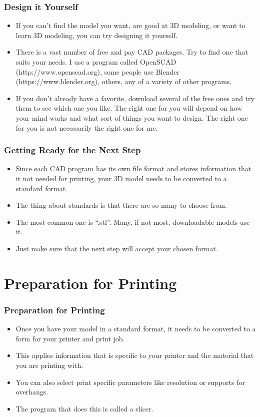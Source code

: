 \documentclass[english,10pt]{beamer}
\begin{document}
\begin{frame}
  \frametitle{Design it Yourself}
  \begin{itemize}
    \item If you can't find the model you want, are good at 3D modeling, or want to learn 3D modeling, you can try designing it yourself.
  
    \item There is a vast number of free and pay CAD packages.  Try to find one that suits your needs.  I use a program called OpenSCAD (http://www.openscad.org), some people use Blender (https://www.blender.org), others, any of a variety of other programs.
  
    \item If you don't already have a favorite, download several of the free ones and try them to see which one you like.  The right one for you will depend on how your mind works and what sort of things you want to design.  The right one for you is not necessarily the right one for me.
  \end{itemize}
\end{frame}

\begin{frame}
  \frametitle{Getting Ready for the Next Step}
  \begin{itemize}
    \item Since each CAD program has its own file format and stores information that it not needed for printing, your 3D model needs to be converted to a standard format.
    \item The thing about standards is that there are so many to choose from.
    \item The most common one is  ``.stl''.  Many, if not most, downloadable models use it.
    \item Just make sure that the next step will accept your chosen format.
  \end{itemize}
\end{frame}

\section{Preparation for Printing}
\begin{frame}
  \frametitle{Preparation for Printing}
  \begin{itemize}
    \item Once you have your model in a standard format, it needs to be converted to a form for your printer and print job.
    \item This applies information that is specific to your printer and the material that you are printing with.
    \item You can also select print specific parameters like resolution or supports for overhangs.
    \item The program that does this is called a slicer.
  \end{itemize}
\end{frame}
\end{document}
